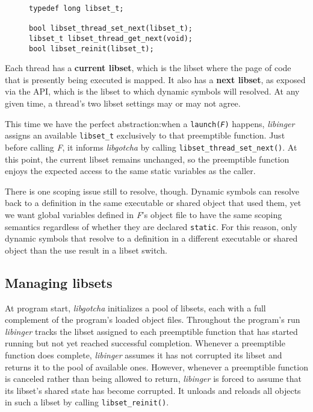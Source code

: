 \begin{figure}
\begin{lstlisting}[label=lst:gotchaapi,caption=libgotcha C interface]
typedef long libset_t;

bool libset_thread_set_next(libset_t);
libset_t libset_thread_get_next(void);
bool libset_reinit(libset_t);
\end{lstlisting}
\end{figure}

Each thread has a \textbf{current libset}, which is the libset where the page of code
that is presently being executed is mapped.  It also has a \textbf{next libset}, as
exposed via the API, which is the libset to which dynamic symbols will resolved.  At
any given time, a thread's two libset settings may or may not agree.

This time we have the perfect abstraction:\@ when a
\texttt{launch(\textnormal{\textit{F}})} happens, \textit{libinger} assigns an
available \texttt{libset\_t} exclusively to that preemptible function.  Just before
calling \textit{F}, it informs \textit{libgotcha} by calling
\texttt{libset\_thread\_set\_next()}.  At this point, the current libset remains
unchanged, so the preemptible function enjoys the expected access to the same static
variables as the caller.

There is one scoping issue still to resolve, though.  Dynamic symbols can resolve back
to a definition in the same executable or shared object that used them, yet we want
global variables defined in \textit{F}'s object file to have the same scoping
semantics regardless of whether they are declared \texttt{static}.  For this reason,
only dynamic symbols that resolve to a definition in a different executable or shared
object than the use result in a libset switch.


\subsection{Managing libsets}

At program start, \textit{libgotcha} initializes a pool of libsets, each with a full
complement of the program's loaded object files.  Throughout the program's run
\textit{libinger} tracks the libset assigned to each preemptible function that has
started running but not yet reached successful completion.  Whenever a preemptible
function does complete, \textit{libinger} assumes it has not corrupted its libset and
returns it to the pool of available ones.  However, whenever a preemptible function
is canceled rather than being allowed to return, \textit{libinger} is forced to
assume that its libset's shared state has become corrupted.  It unloads and reloads
all objects in such a libset by calling \texttt{libset\_reinit()}.

